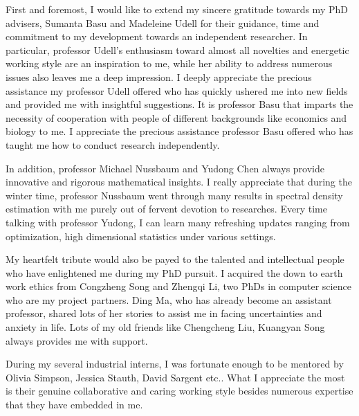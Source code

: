 \documentclass[phd,tocprelim]{cornell}
\numberwithin{equation}{section}
\begin{document}
	\begin{acknowledgements}
		First and foremost, I would like to extend my sincere gratitude towards my PhD advisers, Sumanta Basu and Madeleine Udell for their guidance, time and commitment to my development towards an independent researcher. In particular, professor Udell's enthusiasm toward almost all novelties and energetic working style are an inspiration to me, while her ability to address numerous issues also leaves me a deep impression. I deeply appreciate the precious assistance my professor Udell offered who has quickly ushered me into new fields and provided me with insightful suggestions.
		It is professor Basu that imparts the necessity of cooperation with people of different backgrounds like economics and biology to me.  I appreciate the precious assistance professor Basu offered who has taught me how to conduct research independently. \par 
		In addition, professor Michael Nussbaum and Yudong Chen always provide innovative and rigorous mathematical insights. I really appreciate that during the winter time, professor Nussbaum went through many results in spectral density estimation with me purely out of fervent devotion to researches. Every time talking with professor Yudong, I can learn many refreshing updates ranging from optimization, high dimensional statistics under various settings. \par 
		My heartfelt tribute would also be payed to the talented and intellectual people who have enlightened me during my PhD pursuit. I acquired the down to earth work ethics from Congzheng Song and Zhengqi Li, two PhDs in computer science who are my project partners. Ding Ma, who has already become an assistant professor, shared lots of her stories to assist me in facing uncertainties and anxiety in life. Lots of my old friends like Chengcheng Liu, Kuangyan Song always provides me with support. \par 
		During my several industrial interns, I was fortunate enough to be mentored by Olivia Simpson, Jessica Stauth, David Sargent etc.. What I appreciate the most is their genuine collaborative and caring working style besides numerous expertise that they have embedded in me. 
		
\end{acknowledgements}
	
\contentspage
\listoffigures
\listoftables
	
\end{document}
